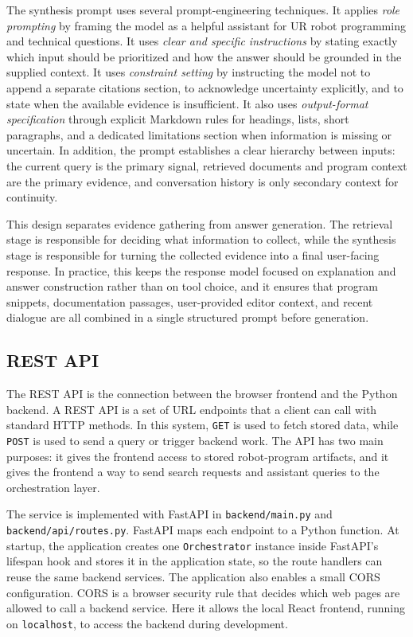 The synthesis prompt uses several prompt-engineering techniques. It applies \textit{role prompting} by framing the model as a helpful assistant for UR robot programming and technical questions. It uses \textit{clear and specific instructions} by stating exactly which input should be prioritized and how the answer should be grounded in the supplied context. It uses \textit{constraint setting} by instructing the model not to append a separate citations section, to acknowledge uncertainty explicitly, and to state when the available evidence is insufficient. It also uses \textit{output-format specification} through explicit Markdown rules for headings, lists, short paragraphs, and a dedicated limitations section when information is missing or uncertain. In addition, the prompt establishes a clear hierarchy between inputs: the current query is the primary signal, retrieved documents and program context are the primary evidence, and conversation history is only secondary context for continuity.

This design separates evidence gathering from answer generation. The retrieval stage is responsible for deciding what information to collect, while the synthesis stage is responsible for turning the collected evidence into a final user-facing response. In practice, this keeps the response model focused on explanation and answer construction rather than on tool choice, and it ensures that program snippets, documentation passages, user-provided editor context, and recent dialogue are all combined in a single structured prompt before generation.


\subsection{REST API}
The REST API is the connection between the browser frontend and the Python backend. A REST API is a set of URL endpoints that a client can call with standard HTTP methods. In this system, \texttt{GET} is used to fetch stored data, while \texttt{POST} is used to send a query or trigger backend work. The API has two main purposes: it gives the frontend access to stored robot-program artifacts, and it gives the frontend a way to send search requests and assistant queries to the orchestration layer.

The service is implemented with FastAPI in \texttt{backend/main.py} and \texttt{backend/api/routes.py}. FastAPI maps each endpoint to a Python function. At startup, the application creates one \texttt{Orchestrator} instance inside FastAPI's lifespan hook and stores it in the application state, so the route handlers can reuse the same backend services. The application also enables a small CORS configuration. CORS is a browser security rule that decides which web pages are allowed to call a backend service. Here it allows the local React frontend, running on \texttt{localhost}, to access the backend during development.

